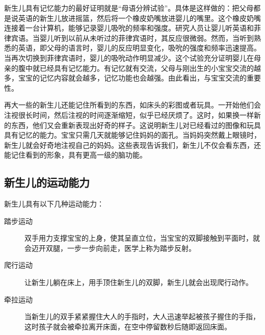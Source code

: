 新生儿具有记忆能力的最好证明就是``母语分辨试验''。具体是这样做的：把父母都是说英语的新生儿放进摇篮，然后将一个橡皮奶嘴放进婴儿的嘴里。这个橡皮奶嘴连接着一台计算机，能够记录婴儿吸吮的频率和强度。研究人员让婴儿听英语和菲律宾语。当婴儿听到以前从未听过的菲律宾语时，其反应很微弱。然而，当听到熟悉的英语，即父母的语言时，婴儿的反应明显变化，吸吮的强度和频率迅速提高。当再次切换到菲律宾语时，婴儿的吸吮动作明显减少。这个试验充分证明婴儿在母亲的腹中就已经具有记忆能力。有记忆就有交流，父母与刚出生的小宝宝交流的越多，宝宝的记忆内容就会越多，记忆功能也会越强。由此看出，与宝宝交流的重要性。

再大一些的新生儿还能记住所看到的东西，如床头的彩图或者玩具。一开始他们会注视很长时间，然后注视的时间逐渐缩短，似乎已经厌烦了。这时，如果换一样新的东西，他们又会重新表现出好奇的样子。这说明新生儿对已经看过的图像和玩具具有记忆的能力。宝宝只需几天就能够记住妈妈的面孔。当妈妈突然戴上眼镜时，新生儿就会好奇地注视自己的妈妈。这些表现告诉我们，新生儿不仅会看东西，还能记住看到的形象，具有更高一级的脑功能。


\subsection{新生儿的运动能力}%

新生儿具有以下几种运动能力：

\begin{description}
\item
[踏步运动]双手用力支撑宝宝的上身，使其呈直立位，当宝宝的双脚接触到平面时，就会迈开双腿，一步一步向前走，医学上称为踏步反射。
\item
[爬行运动]让新生儿躺在床上，用手顶住新生儿的双脚，新生儿就会出现爬行动作。
\item
[牵拉运动]当新生儿的双手紧紧握住大人的手指时，大人迅速举起被孩子握住的手指，这时孩子就会被牵拉离开床面，在空中停留数秒后随即返回床面。
\end{description}

